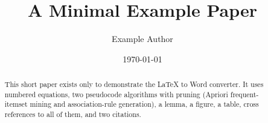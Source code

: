 \documentclass[12pt,a4paper]{article}
\title{A Minimal Example Paper}
\author{Example Author}
\date{\today}
\begin{document}
\maketitle

\begin{abstract}
This short paper exists only to demonstrate the LaTeX to Word converter. It uses
numbered equations, two pseudocode algorithms with pruning (Apriori frequent-itemset
mining and association-rule generation), a lemma, a figure, a table, cross
references to all of them, and two citations.
\end{abstract}







\end{document}
